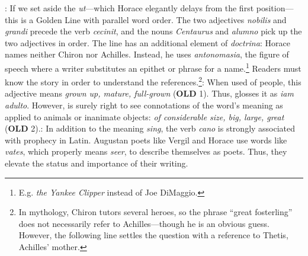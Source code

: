 
: If we set aside the \textit{ut}---which Horace elegantly delays from the first position---this is a Golden Line with parallel word order.  The two adjectives \textit{nobilis} and \textit{grandi} precede the verb \textit{cecinit}, and the nouns \textit{Centaurus} and \textit{alumno} pick up the two adjectives in order.  The line has an additional element of \textit{doctrina}: Horace names neither Chiron nor Achilles.  Instead, he uses \textit{antonomasia}, the figure of speech where a writer substitutes an epithet or phrase for a name.\footnote{E.g. \textit{the Yankee Clipper} instead of Joe DiMaggio.} Readers must know the story in order to understand the references.\footnote{In mythology, Chiron tutors several heroes, so the phrase ``great fosterling'' does not necessarily refer to Achilles---though he is an obvious guess.  However, the following line settles the question with a reference to Thetis, Achilles' mother.}\indent{}: When used of people, this adjective means \textit{grown up, mature, full-grown} (\textbf{OLD} 1).  Thus, \citet{watson2003} glosses it as \textit{iam adulto}.  However, \citet{mankin1995} is surely right to see connotations of the word's meaning as applied to animals or inanimate objects: \textit{of considerable size, big, large, great} (\textbf{OLD} 2).\indent{}: In addition to the meaning \textit{sing}, the verb \textit{cano} is strongly associated with prophecy in Latin.  Augustan poets like Vergil and Horace use words like \textit{vates}, which properly means \textit{seer}, to describe themselves as poets.  Thus, they elevate the status and importance of their writing.


